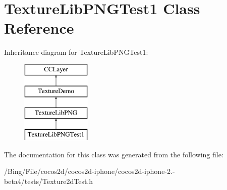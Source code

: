 \hypertarget{interface_texture_lib_p_n_g_test1}{\section{Texture\-Lib\-P\-N\-G\-Test1 Class Reference}
\label{interface_texture_lib_p_n_g_test1}
}
Inheritance diagram for Texture\-Lib\-P\-N\-G\-Test1\-:\begin{figure}[H]
\begin{center}
\leavevmode
\includegraphics[height=4.000000cm]{interface_texture_lib_p_n_g_test1}
\end{center}
\end{figure}


The documentation for this class was generated from the following file\-:\begin{DoxyCompactItemize}
\item 
/\-Bing/\-File/cocos2d/cocos2d-\/iphone/cocos2d-\/iphone-\/2.-\/beta4/tests/Texture2d\-Test.\-h\end{DoxyCompactItemize}
